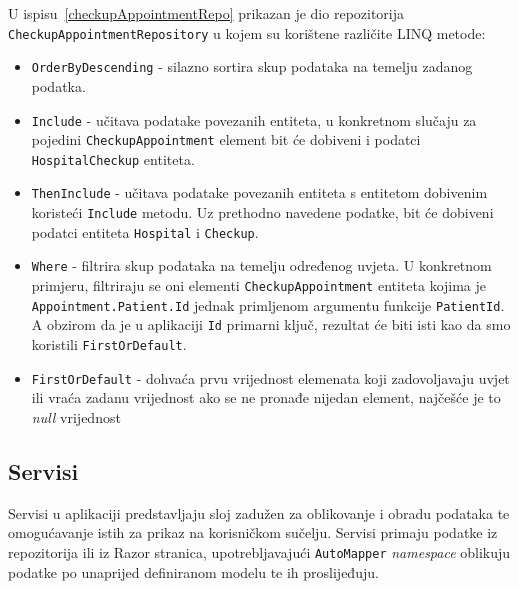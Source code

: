 U ispisu~\ref{checkupAppointmentRepo} prikazan je dio repozitorija \texttt{CheckupAppointmentRepository} u kojem su korištene različite LINQ metode:

\begin{itemize}
\item \texttt{OrderByDescending} - silazno sortira skup podataka na temelju zadanog podatka.

\item \texttt{Include} - učitava podatake povezanih entiteta, u konkretnom slučaju za pojedini \texttt{CheckupAppointment} element bit će dobiveni i podatci \\\texttt{HospitalCheckup} entiteta.

\item \texttt{ThenInclude} - učitava podatake povezanih entiteta s entitetom dobivenim koristeći \texttt{Include} metodu. Uz prethodno navedene podatke, bit će dobiveni podatci entiteta \texttt{Hospital} i \texttt{Checkup}.

\item \texttt{Where} - filtrira skup podataka na temelju određenog uvjeta. U konkretnom primjeru, filtriraju se oni elementi \texttt{CheckupAppointment} entiteta kojima je \\\texttt{Appointment.Patient.Id} jednak primljenom argumentu funkcije \texttt{PatientId}. A obzirom da je u aplikaciji \texttt{Id} primarni ključ, rezultat će biti isti kao da smo koristili \texttt{FirstOrDefault}.

\item \texttt{FirstOrDefault} - dohvaća prvu vrijednost elemenata koji zadovoljavaju uvjet ili vraća zadanu vrijednost ako se ne pronađe nijedan element, najčešće je to \textit{null} vrijednost
\end{itemize}

\subsection{Servisi}

Servisi u aplikaciji predstavljaju sloj zadužen za oblikovanje i obradu podataka te omogućavanje istih za prikaz na korisničkom sučelju. Servisi primaju podatke iz repozitorija ili iz Razor stranica, upotrebljavajući \texttt{AutoMapper} \textit{namespace} oblikuju podatke po unaprijed definiranom modelu te ih proslijeđuju. 


